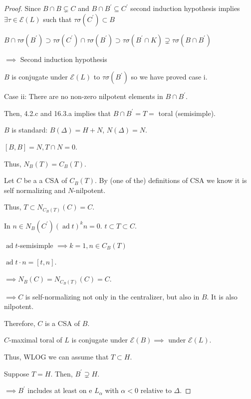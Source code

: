 \documentclass{article}
\theoremstyle{definition}
\begin{document}
\begin{proof}
        Since \(B\cap B \subsetneq C\) and \(B\cap B^{\prime} \subseteq C^{\prime}\) second induction hypothesis implies \(\exists \tau \in \mathscr{E} (L)\) such that \(\tau \sigma (C^{\prime}) \subset B\)
        
        \(B \cap \tau \sigma (B^{\prime}) \supset \tau \sigma (C^{\prime}) \cap \tau \sigma(B^{\prime}) \supset \tau \sigma(B^{\prime} \cap K) \supsetneq \tau \sigma (B\cap B^{\prime})\) 

        \(\implies\) Second induction hypothesis

        \(B\) is conjugate under \(\mathscr{E} (L)\) to \(\tau \sigma (B^{\prime})\) so we have proved case i.

        Case ii: There are no non-zero nilpotent elements in \(B\cap B^{\prime}\). 

        Then, 4.2.c and 16.3.a implies that \(B\cap B^{\prime} = T =\) toral (semisimple).
        
        \(B\) is standard: \(B(\Delta) = H + N\), \(N(\Delta) = N\).

        \([B,B] = N, T\cap N = 0\).

        Thus, \(N_B(T) = C_B(T)\).

        Let \(C\) be a a CSA of \(C_B(T)\). By (one of the) definitions of CSA we know it is self normalizing and \(N\)-nilpotent.

        Thus, \(T \subset N_{C_B(T)}(C) = C\).
        
        In \(n\in N_B(C^{\prime}) (\operatorname{ad} t)^k n = 0\). \(t \subset T \subset C\).
        
        \(\operatorname{ad} t\)-semisimple \(\implies k = 1, n \in C_B(T)\) 

        \(\operatorname{ad} t \cdot n = [t,n]\).

        \(\implies N_B(C) = N_{C_B(T)}(C) = C\).

        \(\implies C\) is self-normalizing not only in the centralizer, but also in \(B\). It is also nilpotent.

        Therefore, \(C\)  is a CSA of \(B\).

        \(C\)-maximal toral of \(L\) is conjugate under \(\mathscr{E} (B) \implies\) under \(\mathscr{E} (L)\).

        Thus, WLOG we can assume that \(T \subset H\).

        Suppose \(T = H\). Then, \(B^{\prime} \supsetneq H\).

        \(\implies B^{\prime}\) includes at least on e \(L_\alpha\) with \(\alpha < 0\) relative to \(\Delta\).
        

\end{proof}
\end{document}
